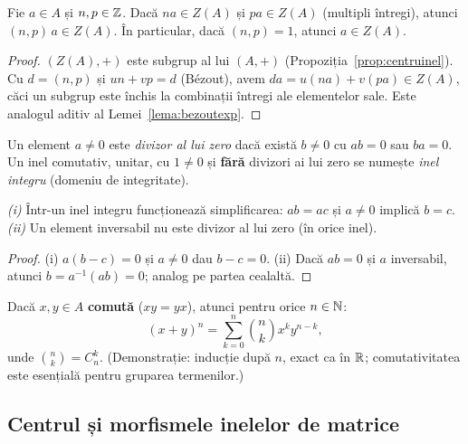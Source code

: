 \begin{lema}\label{lema:bezoutcentru}
Fie $a\in A$ și $n,p\in\mathbb{Z}$. Dacă $na\in Z(A)$ și $pa\in Z(A)$ (multipli întregi), atunci $(n,p)\,a\in Z(A)$. În particular, dacă $(n,p)=1$, atunci $a\in Z(A)$.
\end{lema}

\begin{proof}
$(Z(A),+)$ este subgrup al lui $(A,+)$ (Propoziția~\ref{prop:centruinel}). Cu $d=(n,p)$ și $un+vp=d$ (Bézout), avem $da=u(na)+v(pa)\in Z(A)$, căci un subgrup este închis la combinații întregi ale elementelor sale. Este analogul aditiv al Lemei~\ref{lema:bezoutexp}.
\end{proof}

\begin{definitie}
Un element $a\neq0$ este \emph{divizor al lui zero} dacă există $b\neq0$ cu $ab=0$ sau $ba=0$. Un inel comutativ, unitar, cu $1\neq0$ și \textbf{fără} divizori ai lui zero se numește \emph{inel integru} (domeniu de integritate).
\end{definitie}

\begin{propozitie}\label{prop:integru}
\emph{(i)} Într-un inel integru funcționează simplificarea: $ab=ac$ și $a\neq0$ implică $b=c$. \emph{(ii)} Un element inversabil nu este divizor al lui zero (în orice inel).
\end{propozitie}

\begin{proof}
(i) $a(b-c)=0$ și $a\neq 0$ dau $b-c=0$. (ii) Dacă $ab=0$ și $a$ inversabil, atunci $b=a^{-1}(ab)=0$; analog pe partea cealaltă.
\end{proof}

\begin{propozitie}\label{prop:binom}
Dacă $x,y\in A$ \textbf{comută} ($xy=yx$), atunci pentru orice $n\in\mathbb{N}$:
\[
(x+y)^n=\sum_{k=0}^{n}\binom{n}{k}x^k y^{n-k},
\]
unde $\binom nk=C_n^k$. (Demonstrație: inducție după $n$, exact ca în $\mathbb{R}$; comutativitatea este esențială pentru gruparea termenilor.)
\end{propozitie}

\subsection*{Centrul și morfismele inelelor de matrice}

